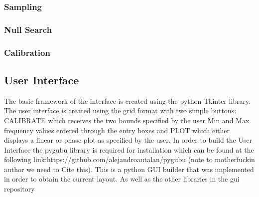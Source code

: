 \subsubsection{Sampling}
\subsubsection{Null Search}
\subsubsection{Calibration}
\subsection{User Interface}

The basic framework of the interface is created using the python Tkinter library. The user interface is created using the grid format with two simple buttons: CALIBRATE which receives the two bounds specified by the user  Min and Max frequency values entered through the entry boxes and PLOT which either displays a linear or phase plot as specified by the user. In order to build the User Interface the pygubu library is required for installation which can be found at the following link:https://github.com/alejandroautalan/pygubu (note to motherfuckin author we need to Cite this). This is a python GUI builder that was implemented in order to obtain the current layout. As well as the other libraries in the gui repository